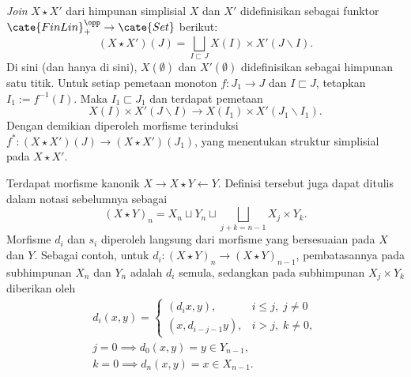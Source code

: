 \begin{definition}\label{def:simplicial-join}
	\emph{Join} $X\star X'$ dari himpunan simplisial $X$ dan $X'$
	didefinisikan sebagai funktor $\cate{FinLin}_+^{\opp}\to\cate{Set}$
	berikut:
	\[ (X \star X')(J) = \bigsqcup_{I \sqsubset J} X(I) \times X'(J \smallsetminus I). \]
	Di sini (dan hanya di sini), $X(\emptyset)$ dan $X'(\emptyset)$
	didefinisikan sebagai himpunan satu titik. Untuk setiap pemetaan monoton
	$f:J_1\to J$ dan $I\sqsubset J$, tetapkan $I_1:=f^{-1}(I)$. Maka
	$I_1\sqsubset J_1$ dan terdapat pemetaan
	\[ X(I) \times X'(J \smallsetminus I) \to X(I_1) \times X'(J_1 \smallsetminus I_1). \]
	Dengan demikian diperoleh morfisme terinduksi
	$f^*:(X\star X')(J)\to(X\star X')(J_1)$, yang menentukan struktur
	simplisial pada $X\star X'$.
\end{definition}

Terdapat morfisme kanonik $X\to X\star Y\leftarrow Y$. Definisi tersebut
juga dapat ditulis dalam notasi sebelumnya sebagai
\[ (X \star Y)_n = X_n \sqcup Y_n \sqcup \bigsqcup_{j+k = n-1} X_j \times Y_k . \]
Morfisme $d_i$ dan $s_i$ diperoleh langsung dari morfisme yang bersesuaian
pada $X$ dan $Y$. Sebagai contoh, untuk $d_i:(X\star Y)_n\to(X\star Y)_{n-1}$,
pembatasannya pada subhimpunan $X_n$ dan $Y_n$ adalah $d_i$ semula,
sedangkan pada subhimpunan $X_j\times Y_k$ diberikan oleh
\begin{equation}\label{eqn:join-formulas}\begin{gathered}
		d_i(x, y) = \begin{cases}
			(d_i x, y), & i \leq j, \; j \neq 0 \\
			(x, d_{i-j-1} y), & i > j, \; k \neq 0,
		\end{cases} \\
		j=0 \implies d_0(x, y) = y \in Y_{n-1}, \\
		k=0 \implies d_n(x, y) = x \in X_{n-1}.
\end{gathered}\end{equation}

